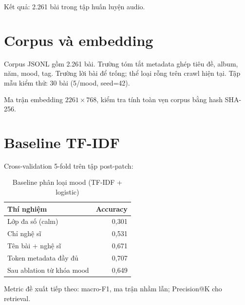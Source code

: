 Kết quả: 2.261 bài trong tập huấn luyện audio.

\section{Corpus và embedding}

Corpus JSONL gồm 2.261 bài. Trường tóm tắt metadata ghép tiêu đề, album, năm, mood, tag. Trường lời bài để trống; thể loại rỗng trên crawl hiện tại. Tập mẫu kiểm thử: 30 bài (5/mood, seed=42).

Ma trận embedding $2261 \times 768$, kiểm tra tính toàn vẹn corpus bằng hash SHA-256.

\section{Baseline TF-IDF}

Cross-validation 5-fold trên tập post-patch:

\begin{table}[htbp]
  \centering
  \caption{Baseline phân loại mood (TF-IDF + logistic)}
  \label{tab:baseline}
  \begin{tabular}{@{}lr@{}}
    \toprule
    \textbf{Thí nghiệm} & \textbf{Accuracy} \\
    \midrule
    Lớp đa số (calm) & 0{,}301 \\
    Chỉ nghệ sĩ & 0{,}531 \\
    Tên bài + nghệ sĩ & 0{,}671 \\
    Token metadata đầy đủ & 0{,}707 \\
    Sau ablation từ khóa mood & 0{,}649 \\
    \bottomrule
  \end{tabular}
\end{table}

Metric đề xuất tiếp theo: macro-F1, ma trận nhầm lẫn; Precision@K cho retrieval.
